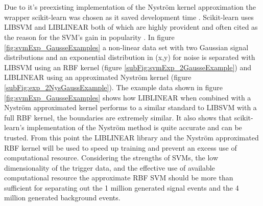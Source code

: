 \\\\Due to it's preexisting implementation of the Nyström kernel approximation the wrapper scikit-learn was chosen as it saved development time \cite{scikit-learn}. Scikit-learn uses LIBSVM \cite{chang2011libsvm} and LIBLINEAR \cite{fan2008liblinear} both of which are highly provident and often cited as the reason for the SVM's gain in popularity \cite{murty2016support}. In figure \ref{fig:svmExp_GausseExamples} a non-linear data set with two Gaussian signal distributions and an exponential distribution in (x,y) for noise is separated with LIBSVM using an RBF kernel (figure \ref{subFig:svmExp_2GausseExample}) and LIBLINEAR using an approximated Nyström kernel (figure \ref{subFig:exp_2NysGaussExample}). The example data shown in figure \ref{fig:svmExp_GausseExamples} shows how LIBLINEAR when combined with a Nyström approximated kernel performs to a similar standard to LIBSVM with a full RBF kernel, the boundaries are extremely similar. It also shows that scikit-learn's implementation of the Nyström method is quite accurate and can be trusted. From this point the LIBLINEAR library and the Nyström approximated RBF kernel will be used to speed up training and prevent an excess use of computational resource. Considering the strengths of SVMs, the low dimensionality of the trigger data, and the effective use of available computational resource the approximate RBF SVM should be more than sufficient for separating out the 1 million generated signal events and the 4 million generated background events. 

